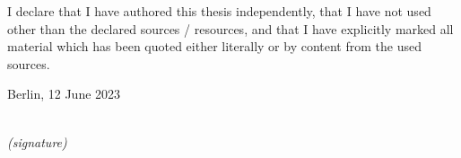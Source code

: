 \newpage
\thispagestyle{empty}

\begin{large}

\vspace*{2cm}

\noindent
I declare that I have authored this thesis independently, that I have not used other than the declared
sources / resources, and that I have explicitly marked all material which has been quoted either
literally or by content from the used sources. 

\vspace{2cm}

\noindent
Berlin, 12 June 2023
\vspace{3cm}

\hspace*{7cm}%
\dotfill\\
\hspace*{8.5cm}%
\textit{(signature)}

\end{large}
